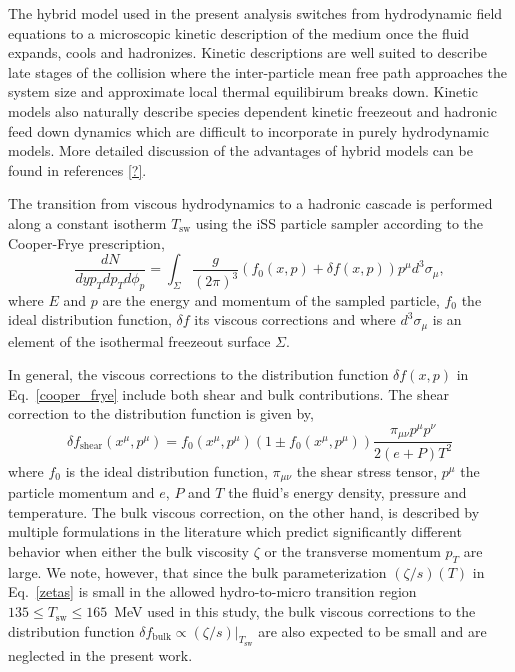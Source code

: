 \documentclass[aps,prc,reprint,amsmath,nofootinbib]{revtex4-1}
\begin{document}
The hybrid model used in the present analysis switches from hydrodynamic field equations to a microscopic kinetic description of the medium once the fluid expands, cools and hadronizes. Kinetic descriptions are well suited to describe late stages of the collision where the inter-particle mean free path approaches the system size and approximate local thermal equilibirum breaks down.
Kinetic models also naturally describe species dependent kinetic freezeout and hadronic feed down dynamics which are difficult to incorporate in purely hydrodynamic models.
More detailed discussion of the advantages of hybrid models can be found in references \ref{?}.

The transition from viscous hydrodynamics to a hadronic cascade is performed along a constant isotherm $T_\text{sw}$ using the iSS particle sampler according to the Cooper-Frye prescription,
\begin{equation}
    \label{cooper_frye}
    \frac{dN}{dy p_T dp_T d\phi_p} = \int_\Sigma \frac{g}{(2\pi)^3} (f_0(x,p) + \delta f(x,p)) p^\mu d^3 \sigma_\mu,
\end{equation}
where $E$ and $p$ are the energy and momentum of the sampled particle, $f_0$ the ideal distribution function, $\delta f$ its viscous corrections and where $d^3\sigma_\mu$ is an element of the isothermal freezeout surface $\Sigma$.

In general, the viscous corrections to the distribution function $\delta f(x, p)$ in Eq.~\eqref{cooper_frye} include both shear and bulk contributions.
The shear correction to the distribution function is given by,
\begin{equation}
    \delta f_\text{shear}(x^\mu, p^\mu) = f_0(x^\mu, p^\mu)(1 \pm f_0(x^\mu, p^\mu))\frac{\pi_{\mu\nu}p^\mu p^\nu}{2(e+P)T^2}
\end{equation}
where $f_0$ is the ideal distribution function, $\pi_{\mu\nu}$ the shear stress tensor, $p^\mu$ the particle momentum and $e$, $P$ and $T$ the fluid's energy density, pressure and temperature.
The bulk viscous correction, on the other hand, is described by multiple formulations in the literature which predict significantly different behavior when either the bulk viscosity $\zeta$ or the transverse momentum $p_T$ are large.
We note, however, that since the bulk parameterization $(\zeta/s)(T)$ in Eq.~\eqref{zetas} is small in the allowed hydro-to-micro transition region $135 \le T_\text{sw} \le 165$~MeV used in this study, the bulk viscous corrections to the distribution function $\delta f_\text{bulk} \propto (\zeta/s)\vert_{T_\text{sw}}$ are also expected to be small and are neglected in the present work.
\end{document}

